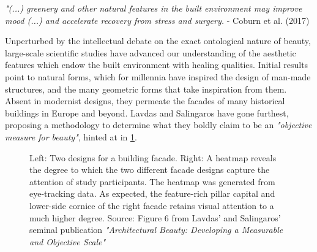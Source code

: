 \documentclass{article}
\begin{document}
\begin{multicols}{2}
\textit{"(...) greenery and other natural features in the built environment may improve mood (...) and accelerate recovery from stress and surgery.} \newline - Coburn et al. (2017) \cite{coburn_buildings_2017}

Unperturbed by the intellectual debate on the exact ontological nature of beauty, large-scale scientific studies have advanced our understanding of the aesthetic features which endow the built environment with healing qualities. Initial results point to natural forms, which for millennia have inspired the design of man-made structures, and the many geometric forms that take inspiration from them. Absent in modernist designs, they permeate the facades of many historical buildings in Europe and beyond. Lavdas and Salingaros have gone furthest, proposing a methodology to determine what they boldly claim to be an \textit{"objective measure for beauty"}, hinted at in \cref{fig:heatmap}.

\end{multicols}

\begin{figure}[H]
    \centering
     \hspace{2.5mm}
    \caption{Left: Two designs for a building facade. Right: A heatmap reveals the degree to which the two different facade designs capture the attention of study participants. The heatmap was generated from eye-tracking data. As expected, the feature-rich pillar capital and lower-side cornice of the right facade retains visual attention to a much higher degree. Source: Figure 6 from Lavdas' and Salingaros' seminal publication \textit{"Architectural Beauty: Developing a Measurable and Objective Scale"} \cite{lavdas_architectural_2022}}
    \label{fig:heatmap}
\end{figure}
\end{document}
